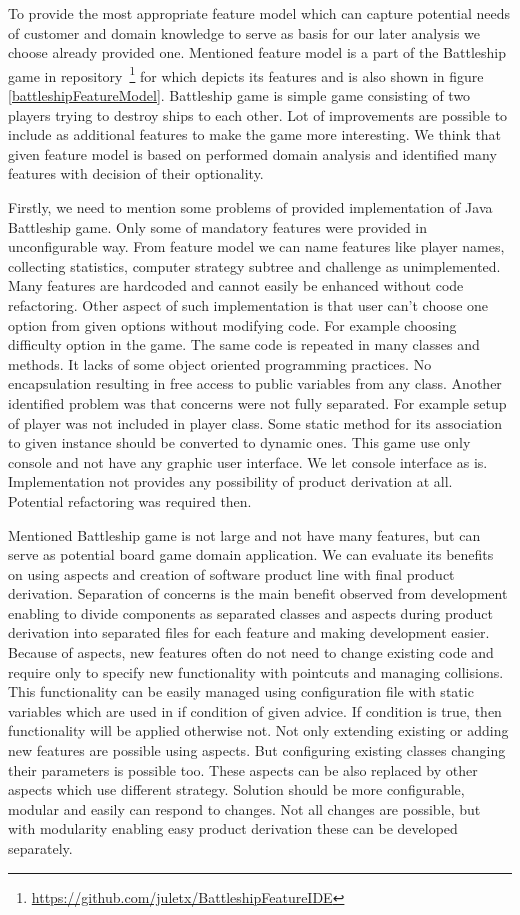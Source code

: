 \documentclass[11pt,english,a4paper,twoside]{article}
\begin{document}
To provide the most appropriate feature model which can capture potential needs of customer and domain knowledge to serve as basis for our later analysis we choose already provided one. Mentioned feature model is a part of the Battleship game in repository~\footnote{\url{https://github.com/juletx/BattleshipFeatureIDE}} for which depicts its features and is also shown in figure \ref{battleshipFeatureModel}. Battleship game is simple game consisting of two players trying to destroy ships to each other. Lot of improvements are possible to include as additional features to make the game more interesting. We think that given feature model is based on performed domain analysis and identified many features with decision of their optionality.

Firstly, we need to mention some problems of provided implementation of Java Battleship game. Only some of mandatory features were provided in unconfigurable way. From feature model we can name features like player names, collecting statistics, computer strategy subtree and challenge as unimplemented. Many features are hardcoded and cannot easily be enhanced without code refactoring. Other aspect of such implementation is that user can't choose one option from given options without modifying code. For example choosing difficulty option in the game. The same code is repeated in many classes and methods. It lacks of some object oriented programming practices. No encapsulation resulting in free access to public variables from any class. Another identified problem was that concerns were not fully separated. For example setup of player was not included in player class. Some static method for its association to given instance should be converted to dynamic ones. This game use only console and not have any graphic user interface. We let console interface as is. Implementation not provides any possibility of product derivation at all. Potential refactoring was required then. 

Mentioned Battleship game is not large and not have many features, but can serve as potential board game domain application. We can evaluate its benefits on using aspects and creation of software product line with final product derivation. Separation of concerns is the main benefit observed from development enabling to divide components as separated classes and aspects during product derivation into separated files for each feature and making development easier. Because of aspects, new features often do not need to change existing code and require only to specify new functionality with pointcuts and managing collisions. This functionality can be easily managed using configuration file with static variables which are used in if condition of given advice. If condition is true, then functionality will be applied otherwise not. Not only extending existing or adding new features are possible using aspects. But configuring existing classes changing their parameters is possible too. These aspects can be also replaced by other aspects which use different strategy. Solution should be more configurable, modular and easily can respond to changes. Not all changes are possible, but with modularity enabling easy product derivation these can be developed separately.
\end{document}
